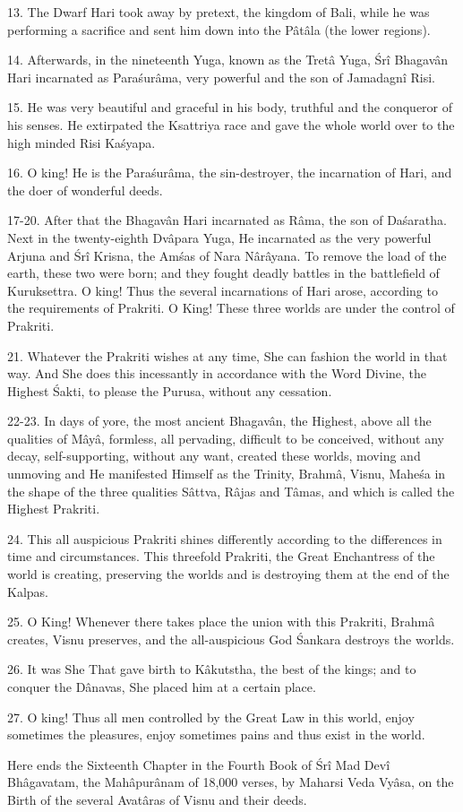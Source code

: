 13. The Dwarf Hari took away by pretext, the kingdom of Bali, while he was performing a sacrifice and sent him down into the P\^at\^ala (the lower regions).

14. Afterwards, in the nineteenth Yuga, known as the Tret\^a Yuga, \'Sr\^i Bhagav\^an Hari incarnated as Para\'sur\^ama, very powerful and the son of Jamadagn\^i Risi.

15. He was very beautiful and graceful in his body, truthful and the conqueror of his senses. He extirpated the Ksattriya race and gave the whole world over to the high minded Risi Ka\'syapa.

16. O king! He is the Para\'sur\^ama, the sin-destroyer, the incarnation of Hari, and the doer of wonderful deeds.

17-20. After that the Bhagav\^an Hari incarnated as R\^ama, the son of Da\'saratha. Next in the twenty-eighth Dv\^apara Yuga, He incarnated as the very powerful Arjuna and \'Sr\^i Krisna, the Am\'sas of Nara N\^ar\^ayana. To remove the load of the earth, these two were born; and they fought deadly battles in the battlefield of Kuruksettra. O king! Thus the several incarnations of Hari arose, according to the requirements of Prakriti. O King! These three worlds are under the control of Prakriti.

21. Whatever the Prakriti wishes at any time, She can fashion the world in that way. And She does this incessantly in accordance with the Word Divine, the Highest \'Sakti, to please the Purusa, without any cessation.

22-23. In days of yore, the most ancient Bhagav\^an, the Highest, above all the qualities of M\^ay\^a, formless, all pervading, difficult to be conceived, without any decay, self-supporting, without any want, created these worlds, moving and unmoving and He manifested Himself as the Trinity, Brahm\^a, Visnu, Mahe\'sa in the shape of the three qualities S\^attva, R\^ajas and T\^amas, and which is called the Highest Prakriti.

24. This all auspicious Prakriti shines differently according to the differences in time and circumstances. This threefold Prakriti, the Great Enchantress of the world is creating, preserving the worlds and is destroying them at the end of the Kalpas.

25. O King! Whenever there takes place the union with this Prakriti, Brahm\^a creates, Visnu preserves, and the all-auspicious God \'Sankara destroys the worlds.

26. It was She That gave birth to K\^akutstha, the best of the kings; and to conquer the D\^anavas, She placed him at a certain place.

27. O king! Thus all men controlled by the Great Law in this world, enjoy sometimes the pleasures, enjoy sometimes pains and thus exist in the world.

Here ends the Sixteenth Chapter in the Fourth Book of \'Sr\^i Mad Dev\^i Bh\^agavatam, the Mah\^apur\^anam of 18,000 verses, by Maharsi Veda Vy\^asa, on the Birth of the several Avat\^aras of Visnu and their deeds.